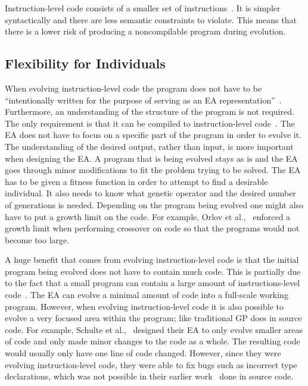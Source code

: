 \documentclass{sig-alternate}
\begin{document}
Instruction-level code consists of a smaller set of instructions~\cite{Assembly:2010}. It is simpler syntactically and there are less semantic constraints to violate. This means that there is a lower risk of producing a noncompilable program during evolution.

\subsection{Flexibility  for Individuals}

When evolving instruction-level code the program does not have to be ``intentionally written for the purpose of serving as an EA representation''~\cite{FINCH2:2009}. Furthermore, an understanding of the structure of the program is not required. The only requirement is that it can be compiled to instruction-level code~\cite{FINCH2:2009, Assembly:2010}. The EA does not have to focus on a specific part of the program in order to evolve it. The understanding of the desired output, rather than input, is more important when designing the EA. A program that is being evolved stays as is and the EA goes through minor modifications to fit the problem trying to be solved. The EA has to be given a fitness function in order to attempt to find a desirable individual. It also needs to know what genetic operator and the desired number of generations is needed. Depending on the program being evolved one might also have to put a growth limit on the code. For example, Orlov et al.,~\cite{FINCH:2011} enforced a growth limit when performing crossover on code so that the programs would not become too large.

A huge benefit that comes from evolving instruction-level code is that the initial program being evolved does not have to contain much code. This is partially due to the fact that a small program can contain a large amount of instructions-level code~\cite{Assembly:2010}. The EA can evolve a minimal amount of code into a full-scale working program. However, when evolving instruction-level code it is also possible to evolve a very focused area within the program; like traditional GP does in source code. For example, Schulte et al.,~\cite{Assembly:2010} designed their EA to only evolve smaller areas of code and only made minor changes to the code as a whole. The resulting code would usually only have one line of code changed. However, since they were evolving instruction-level code, they were able to fix bugs such as incorrect type declarations, which was not possible in their earlier work~\cite{Forrest:2009} done in source code. 
\end{document}
